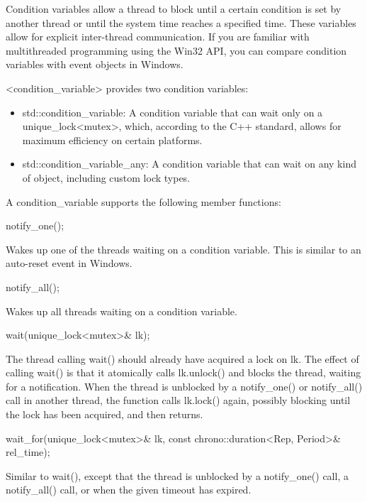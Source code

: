 
Condition variables allow a thread to block until a certain condition is set by another thread or until the system time reaches a specified time. These variables allow for explicit inter-thread communication. If you are familiar with multithreaded programming using the Win32 API, you can compare condition variables with event objects in Windows.

<condition\_variable> provides two condition variables:

\begin{itemize}
\item
std::condition\_variable: A condition variable that can wait only on a unique\_lock<mutex>, which, according to the C++ standard, allows for maximum efficiency on certain platforms.

\item
std::condition\_variable\_any: A condition variable that can wait on any kind of object, including custom lock types.
\end{itemize}

A condition\_variable supports the following member functions:

\begin{cpp}
notify_one();
\end{cpp}

Wakes up one of the threads waiting on a condition variable. This is similar to an auto-reset event in Windows.

\begin{cpp}
notify_all();
\end{cpp}

Wakes up all threads waiting on a condition variable.

\begin{cpp}
wait(unique_lock<mutex>& lk);
\end{cpp}

The thread calling wait() should already have acquired a lock on lk. The effect of calling wait() is that it atomically calls lk.unlock() and blocks the thread, waiting for a notification. When the thread is unblocked by a notify\_one() or notify\_all() call in another thread, the function calls lk.lock() again, possibly blocking until the lock has been acquired, and then returns.

\begin{cpp}
wait_for(unique_lock<mutex>& lk, const chrono::duration<Rep, Period>& rel_time);
\end{cpp}

Similar to wait(), except that the thread is unblocked by a notify\_one() call, a notify\_all() call, or when the given timeout has expired.

